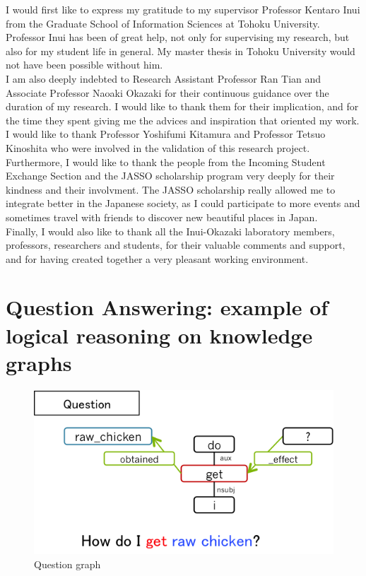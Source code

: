 \documentclass[12pt]{article}
\begin{document}
\newpage
\acknowledgements
I would first like to express my gratitude to my supervisor Professor Kentaro Inui from the Graduate School of Information Sciences at Tohoku University. Professor Inui has been of great help, not only for supervising my research, but also for my student life in general. My master thesis in Tohoku University would not have been possible without him.\\
I am also deeply indebted to Research Assistant Professor Ran Tian and Associate Professor Naoaki Okazaki for their continuous guidance over the duration of my research. I would like to thank them for their implication, and for the time they spent giving me the advices and inspiration that oriented my work.\\
I would like to thank Professor Yoshifumi Kitamura and Professor Tetsuo Kinoshita who were involved in the validation of this research project.\\
Furthermore, I would like to thank the people from the Incoming Student Exchange Section and the JASSO scholarship program very deeply for their kindness and their involvment. The JASSO scholarship really allowed me to integrate better in the Japanese society, as I could participate to more events and sometimes travel with friends to discover new beautiful places in Japan.\\
Finally, I would also like to thank all the Inui-Okazaki laboratory members, professors, researchers and students, for their valuable comments and support, and for having created together a very pleasant working environment.

\newpage



\newpage
\appendix

\section{\label{annexeQA}Question Answering: example of logical reasoning on knowledge graphs}

\begin{figure}[!htbp]
   \centering \includegraphics[width=0.6\linewidth]{Figures/Question_Answering/question.png}
   \caption{\label{questionEx} Question graph}
\end{figure}
\end{document}
